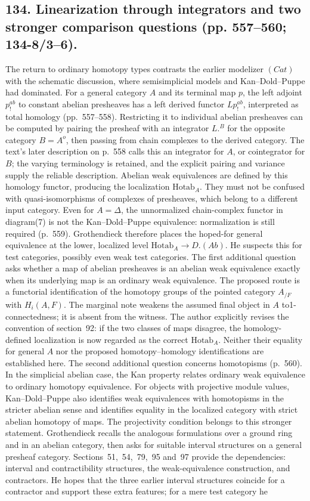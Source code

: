\documentclass[10pt,oneside]{book}
\begin{document}
\subsection*{134. Linearization through integrators and two stronger comparison questions (pp. 557--560; 134-8/3--6).}
The return to ordinary homotopy types contrasts the earlier modelizer $(Cat)$ with the schematic discussion, where semisimplicial models and Kan--Dold--Puppe had dominated. For a general category $A$ and its terminal map $p$, the left adjoint $p^{ab}_{!}$ to constant abelian presheaves has a left derived functor $Lp^{ab}_{!}$, interpreted as total homology (pp.~557--558). Restricting it to individual abelian presheaves can be computed by pairing the presheaf with an integrator $L.^B$ for the opposite category $B=A^o$, then passing from chain complexes to the derived category. The text's later description on p.~558 calls this an integrator for $A$, or cointegrator for $B$; the varying terminology is retained, and the explicit pairing and variance supply the reliable description. Abelian weak equivalences are defined by this homology functor, producing the localization $\mathrm{Hotab}_A$. They must not be confused with quasi-isomorphisms of complexes of presheaves, which belong to a different input category. Even for $A=\Delta$, the unnormalized chain-complex functor in diagram(7) is not the Kan--Dold--Puppe equivalence: normalization is still required (p.~559). Grothendieck therefore places the hoped-for general equivalence at the lower, localized level $\mathrm{Hotab}_A\to D.(Ab)$. He suspects this for test categories, possibly even weak test categories. The first additional question asks whether a map of abelian presheaves is an abelian weak equivalence exactly when its underlying map is an ordinary weak equivalence. The proposed route is a functorial identification of the homotopy groups of the pointed category $A_{/F}$ with $H_i(A,F)$. The marginal note weakens the assumed final object in $A$ to1-connectedness; it is absent from the witness. The author explicitly revises the convention of section~92: if the two classes of maps disagree, the homology-defined localization is now regarded as the correct $\mathrm{Hotab}_A$. Neither their equality for general $A$ nor the proposed homotopy--homology identifications are established here. The second additional question concerns homotopisms (p.~560). In the simplicial abelian case, the Kan property relates ordinary weak equivalence to ordinary homotopy equivalence. For objects with projective module values, Kan--Dold--Puppe also identifies weak equivalences with homotopisms in the stricter abelian sense and identifies equality in the localized category with strict abelian homotopy of maps. The projectivity condition belongs to this stronger statement. Grothendieck recalls the analogous formulations over a ground ring and in an abelian category, then asks for suitable interval structures on a general presheaf category. Sections~51,~54,~79,~95 and~97 provide the dependencies: interval and contractibility structures, the weak-equivalence construction, and contractors. He hopes that the three earlier interval structures coincide for a contractor and support these extra features; for a mere test category he 
\end{document}
